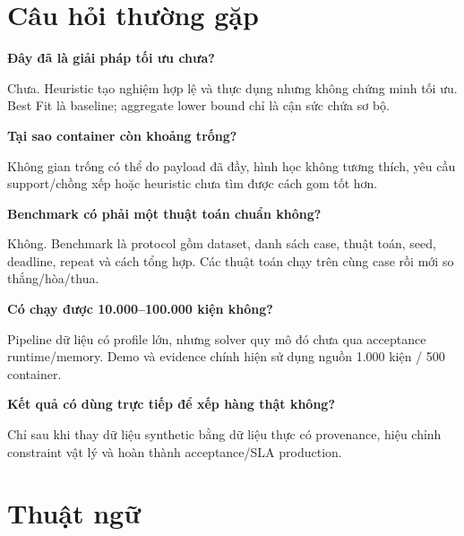 \documentclass[12pt,a4paper]{article}
\begin{document}
\section{Câu hỏi thường gặp}

\textbf{Đây đã là giải pháp tối ưu chưa?}

Chưa. Heuristic tạo nghiệm hợp lệ và thực dụng nhưng không chứng minh tối ưu. Best Fit là
baseline; aggregate lower bound chỉ là cận sức chứa sơ bộ.

\textbf{Tại sao container còn khoảng trống?}

Không gian trống có thể do payload đã đầy, hình học không tương thích, yêu cầu support/chồng
xếp hoặc heuristic chưa tìm được cách gom tốt hơn.

\textbf{Benchmark có phải một thuật toán chuẩn không?}

Không. Benchmark là protocol gồm dataset, danh sách case, thuật toán, seed, deadline, repeat
và cách tổng hợp. Các thuật toán chạy trên cùng case rồi mới so thắng/hòa/thua.

\textbf{Có chạy được 10.000--100.000 kiện không?}

Pipeline dữ liệu có profile lớn, nhưng solver quy mô đó chưa qua acceptance runtime/memory.
Demo và evidence chính hiện sử dụng nguồn 1.000 kiện / 500 container.

\textbf{Kết quả có dùng trực tiếp để xếp hàng thật không?}

Chỉ sau khi thay dữ liệu synthetic bằng dữ liệu thực có provenance, hiệu chỉnh constraint
vật lý và hoàn thành acceptance/SLA production.

\section{Thuật ngữ}
\end{document}
